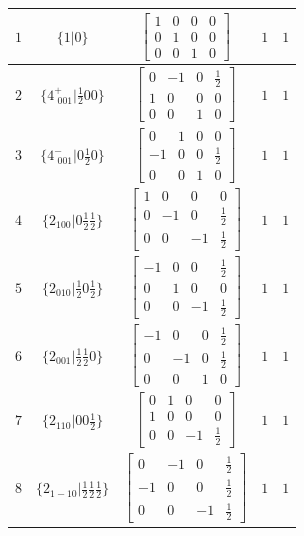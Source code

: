 \documentclass[fleqn,8pt]{jsarticle}
\begin{document}
\begin{longtable}{ccccc}
$ 1 $ & $ \{1|0\} $ & $ \begin{bmatrix} 1 & 0 & 0 & 0 \\ 0 & 1 & 0 & 0 \\ 0 & 0 & 1 & 0 \end{bmatrix} $ & $ 1 $ & $ 1 $ \\ \hline
$ 2 $ & $ \{4^{+}_{\,\,001}|\frac{1}{2} 0 0\} $ & $ \begin{bmatrix} 0 & -1 & 0 & \frac{1}{2} \\ 1 & 0 & 0 & 0 \\ 0 & 0 & 1 & 0 \end{bmatrix} $ & $ 1 $ & $ 1 $ \\ \hline
$ 3 $ & $ \{4^{-}_{\,\,001}|0 \frac{1}{2} 0\} $ & $ \begin{bmatrix} 0 & 1 & 0 & 0 \\ -1 & 0 & 0 & \frac{1}{2} \\ 0 & 0 & 1 & 0 \end{bmatrix} $ & $ 1 $ & $ 1 $ \\ \hline
$ 4 $ & $ \{2{}_{100}|0 \frac{1}{2} \frac{1}{2}\} $ & $ \begin{bmatrix} 1 & 0 & 0 & 0 \\ 0 & -1 & 0 & \frac{1}{2} \\ 0 & 0 & -1 & \frac{1}{2} \end{bmatrix} $ & $ 1 $ & $ 1 $ \\ \hline
$ 5 $ & $ \{2{}_{010}|\frac{1}{2} 0 \frac{1}{2}\} $ & $ \begin{bmatrix} -1 & 0 & 0 & \frac{1}{2} \\ 0 & 1 & 0 & 0 \\ 0 & 0 & -1 & \frac{1}{2} \end{bmatrix} $ & $ 1 $ & $ 1 $ \\ \hline
$ 6 $ & $ \{2{}_{001}|\frac{1}{2} \frac{1}{2} 0\} $ & $ \begin{bmatrix} -1 & 0 & 0 & \frac{1}{2} \\ 0 & -1 & 0 & \frac{1}{2} \\ 0 & 0 & 1 & 0 \end{bmatrix} $ & $ 1 $ & $ 1 $ \\ \hline
$ 7 $ & $ \{2{}_{110}|0 0 \frac{1}{2}\} $ & $ \begin{bmatrix} 0 & 1 & 0 & 0 \\ 1 & 0 & 0 & 0 \\ 0 & 0 & -1 & \frac{1}{2} \end{bmatrix} $ & $ 1 $ & $ 1 $ \\ \hline
$ 8 $ & $ \{2{}_{1-10}|\frac{1}{2} \frac{1}{2} \frac{1}{2}\} $ & $ \begin{bmatrix} 0 & -1 & 0 & \frac{1}{2} \\ -1 & 0 & 0 & \frac{1}{2} \\ 0 & 0 & -1 & \frac{1}{2} \end{bmatrix} $ & $ 1 $ & $ 1 $ \\ \hline

\end{longtable}
\end{document}
